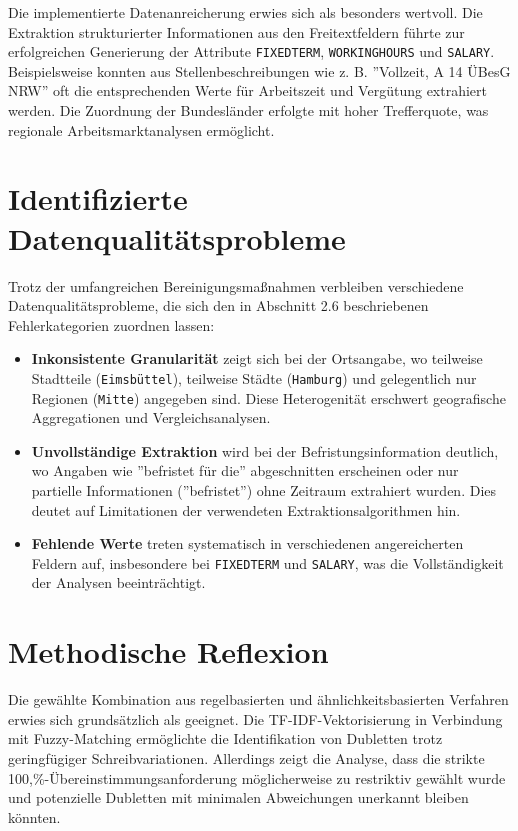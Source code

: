 \documentclass[
    a4paper,
    12pt,
    headinclude=true,
    BCOR=10mm,
]{scrreprt}
\begin{document}
Die implementierte Datenanreicherung erwies sich als besonders wertvoll. Die Extraktion strukturierter Informationen aus den Freitextfeldern führte zur erfolgreichen Generierung der Attribute \texttt{FIXEDTERM}, \texttt{WORKINGHOURS} und \texttt{SALARY}. Beispielsweise konnten aus Stellenbeschreibungen wie z. B.  ''Vollzeit, A 14 ÜBesG NRW'' oft die entsprechenden Werte für Arbeitszeit und Vergütung extrahiert werden. Die Zuordnung der Bundesländer erfolgte mit hoher Trefferquote, was regionale Arbeitsmarktanalysen ermöglicht.

\section{Identifizierte Datenqualitätsprobleme}
Trotz der umfangreichen Bereinigungsmaßnahmen verbleiben verschiedene Datenqualitätsprobleme, die sich den in Abschnitt 2.6 beschriebenen Fehlerkategorien zuordnen lassen:
\begin{itemize}
    \item \textbf{Inkonsistente Granularität} zeigt sich bei der Ortsangabe, wo teilweise Stadtteile (\texttt{Eimsbüttel}), teilweise Städte (\texttt{Hamburg}) und gelegentlich nur Regionen (\texttt{Mitte}) angegeben sind. Diese Heterogenität erschwert geografische Aggregationen und Vergleichsanalysen.
    \item \textbf{Unvollständige Extraktion} wird bei der Befristungsinformation deutlich, wo Angaben wie ''befristet für die'' abgeschnitten erscheinen oder nur partielle Informationen (''befristet'') ohne Zeitraum extrahiert wurden. Dies deutet auf Limitationen der verwendeten Extraktionsalgorithmen hin.
    \item \textbf{Fehlende Werte} treten systematisch in verschiedenen angereicherten Feldern auf, insbesondere bei \texttt{FIXEDTERM} und \texttt{SALARY}, was die Vollständigkeit der Analysen beeinträchtigt.
\end{itemize}

\section{Methodische Reflexion}
Die gewählte Kombination aus regelbasierten und ähnlichkeitsbasierten Verfahren erwies sich grundsätzlich als geeignet. Die TF-IDF-Vektorisierung in Verbindung mit Fuzzy-Matching ermöglichte die Identifikation von Dubletten trotz geringfügiger Schreibvariationen. Allerdings zeigt die Analyse, dass die strikte 100,\%-Übereinstimmungsanforderung möglicherweise zu restriktiv gewählt wurde und potenzielle Dubletten mit minimalen Abweichungen unerkannt bleiben könnten.
\end{document}
